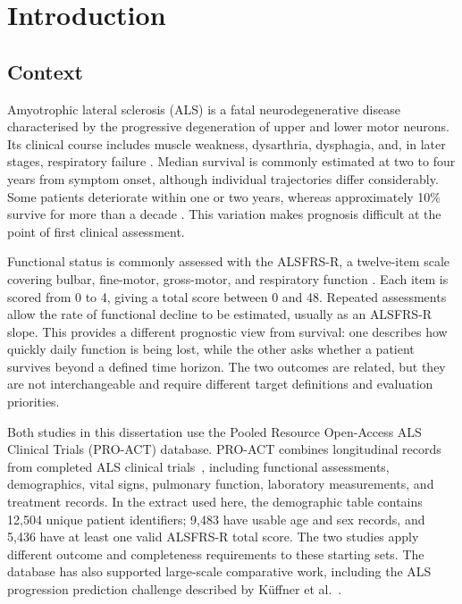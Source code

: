 \chapter{Introduction}
\label{sec:introduction}

\section{Context}
\label{subsec:context}

Amyotrophic lateral sclerosis (\gls{ALS}) is a fatal neurodegenerative disease characterised by the progressive degeneration of upper and lower motor neurons. Its clinical course includes muscle weakness, dysarthria, dysphagia, and, in later stages, respiratory failure \cite{Feldman2022}. Median survival is commonly estimated at two to four years from symptom onset, although individual trajectories differ considerably. Some patients deteriorate within one or two years, whereas approximately 10\% survive for more than a decade \cite{Feldman2022}. This variation makes prognosis difficult at the point of first clinical assessment.

Functional status is commonly assessed with the \gls{ALSFRS-R}, a twelve-item scale covering bulbar, fine-motor, gross-motor, and respiratory function \cite{cedarbaum1999alsfrs}. Each item is scored from 0 to 4, giving a total score between 0 and 48. Repeated assessments allow the rate of functional decline to be estimated, usually as an \gls{ALSFRS-R} slope. This provides a different prognostic view from survival: one describes how quickly daily function is being lost, while the other asks whether a patient survives beyond a defined time horizon. The two outcomes are related, but they are not interchangeable and require different target definitions and evaluation priorities.

Both studies in this dissertation use the Pooled Resource Open-Access ALS Clinical Trials (\gls{PRO-ACT}) database. \gls{PRO-ACT} combines longitudinal records from completed ALS clinical trials~\cite{atassi2014proact}, including functional assessments, demographics, vital signs, pulmonary function, laboratory measurements, and treatment records. In the extract used here, the demographic table contains 12,504 unique patient identifiers; 9,483 have usable age and sex records, and 5,436 have at least one valid \gls{ALSFRS-R} total score. The two studies apply different outcome and completeness requirements to these starting sets. The database has also supported large-scale comparative work, including the ALS progression prediction challenge described by K\"uffner et al.\ \cite{PROACT,kueffner2015}.

